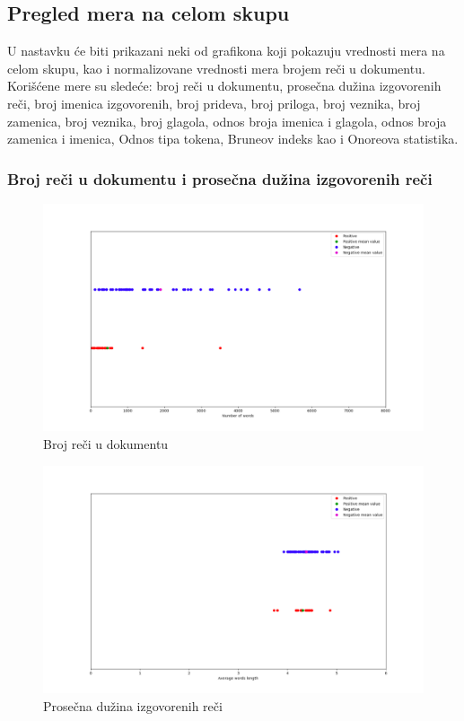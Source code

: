 \documentclass[12pt,oneside]{memoir}
\begin{document}
\subsection{Pregled mera na celom skupu}

U nastavku će biti prikazani neki od grafikona koji pokazuju vrednosti mera na celom skupu, kao i normalizovane vrednosti mera brojem reči u dokumentu.  Korišćene mere su sledeće: broj reči u dokumentu,  prosečna dužina izgovorenih reči,  broj imenica izgovorenih, broj prideva,  broj priloga, broj veznika,  broj zamenica,  broj veznika,  broj glagola,  odnos broja imenica i glagola, odnos broja zamenica i imenica,  Odnos tipa tokena, Bruneov indeks kao i Onoreova statistika. 

\subsubsection{Broj reči u dokumentu i prosečna dužina izgovorenih reči}

\begin{figure}[h!]
\centering
\includegraphics[width=.9\textwidth]{images/reci.png}
\caption{ Broj reči u dokumentu }
\label{img:brojreci}
\end{figure}

\begin{figure}[h!]
\centering
\includegraphics[width=.9\textwidth]{images/duzinareci.png}
\caption{ Prosečna dužina izgovorenih reči }
\label{img:duzinareci}
\end{figure}
\end{document}

